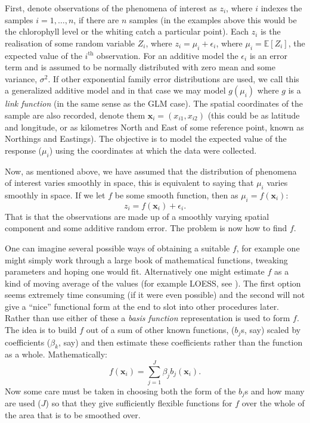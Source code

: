 First, denote observations of the phenomena of interest as $z_i$, where $i$ indexes the samples $i=1,\ldots,n$, if there are $n$ samples (in the examples above this would be the chlorophyll level or the whiting catch a particular point). Each  $z_i$ is the realisation of some random variable $Z_i$, where $z_i=\mu_i+\epsilon_i$, where $\mu_i=\mathbb{E}[Z_i]$, the expected value of the $i^\text{th}$ observation. For an additive model the $\epsilon_i$ is an error term and is assumed to be normally distributed with zero mean and some variance, $\sigma^2$. If other exponential family error distributions are used, we call this a generalized additive model and in that case we may model $g(\mu_i)$ where $g$ is a \textit{link function} (in the same sense as the GLM case). The spatial coordinates of the sample are also recorded, denote them $\mathbf{x}_i = (x_{i1}, x_{i2})$ (this could be as latitude and longitude, or as kilometres North and East of some reference point, known as Northings and Eastings). The objective is to model the expected value of the response ($\mu_i$) using the coordinates at which the data were collected.

Now, as mentioned above, we have assumed that the distribution of phenomena of interest varies smoothly in space, this is equivalent to saying that $\mu_i$ varies smoothly in space. If we let $f$ be some smooth function, then as $\mu_i = f(\mathbf{x}_i)$:
\begin{equation}
z_i = f(\mathbf{x}_i) + \epsilon_i.
\end{equation}
That is that the observations are made up of a smoothly varying spatial component and some additive random error. The problem is now how to find $f$.

One can imagine several possible ways of obtaining a suitable $f$, for example one might simply work through a large book of mathematical functions, tweaking parameters and hoping one would fit. Alternatively one might estimate $f$ as a kind of moving average of the values (for example LOESS, see \cite{loess2}). The first option seems extremely time consuming (if it were even possible) and the second will not give a ``nice'' functional form at the end to slot into other procedures later. Rather than use either of these a \textit{basis function} representation is used to form $f$. The idea is to build $f$ out of a sum of other known functions, ($b_j$s, say) scaled by coefficients ($\beta_k$, say) and then estimate these coefficients rather than the function as a whole. Mathematically:
\begin{equation}
 f(\mathbf{x}_{i}) = \sum_{j=1}^J \beta_j b_j(\mathbf{x}_{i}).
\label{intro-basisdecomp}
\end{equation}
Now some care must be taken in choosing both the form of the $b_j$s and how many are used ($J$) so that they give sufficiently flexible functions for $f$ over the whole of the area that is to be smoothed over. 

